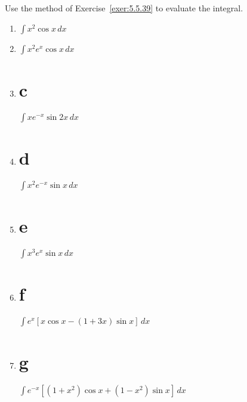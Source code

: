 \documentclass{ximera}
\begin{document}
\begin{problem}\label{exer:5.5.40}
Use the method of Exercise~\ref{exer:5.5.39} to evaluate the integral.

\begin{enumerate}
    
\item  $\int x^2\cos x\,dx$ 

\item  $\int x^2e^x\cos x\,dx$ 

\item   \part{c} $\int xe^{-x}\sin2x\,dx$ 

\item \part{d} $\int x^2e^{-x}\sin x\,dx$ 

\item \part{e} $\int x^3e^x\sin x\,dx$ 

\item \part{f} $\int e^x\left[x\cos x-(1+3x)\sin x\right]\,dx$ 

\item \part{g} $\int e^{-x}\left[(1+x^2)\cos x+(1-x^2)\sin x\right]\,dx$
\end{enumerate}
\end{problem}
\end{document}
